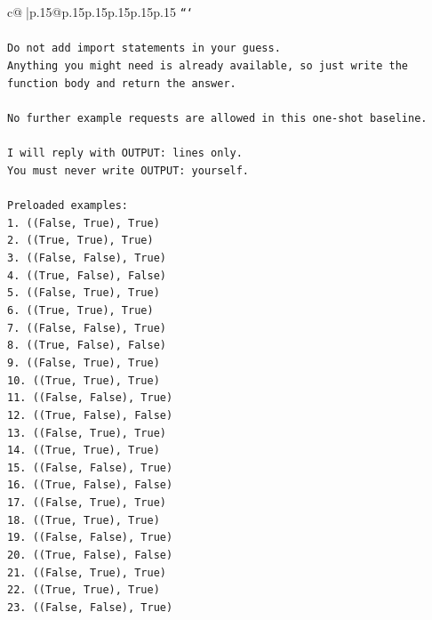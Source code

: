 \documentclass{article}
\begin{document}
{\begin{supertabular}{c@{$\;$}|p{.15\linewidth}@{}p{.15\linewidth}p{.15\linewidth}p{.15\linewidth}p{.15\linewidth}p{.15\linewidth}}
{{{\texttt{```} \\
\\ 
\texttt{Do not add import statements in your guess.} \\
\texttt{Anything you might need is already available, so just write the function body and return the answer.} \\
\\ 
\texttt{No further example requests are allowed in this one{-}shot baseline.} \\
\\ 
\texttt{I will reply with OUTPUT: lines only.} \\
\texttt{You must never write OUTPUT: yourself.} \\
\\ 
\texttt{Preloaded examples:} \\
\texttt{1. ((False, True), True)} \\
\texttt{2. ((True, True), True)} \\
\texttt{3. ((False, False), True)} \\
\texttt{4. ((True, False), False)} \\
\texttt{5. ((False, True), True)} \\
\texttt{6. ((True, True), True)} \\
\texttt{7. ((False, False), True)} \\
\texttt{8. ((True, False), False)} \\
\texttt{9. ((False, True), True)} \\
\texttt{10. ((True, True), True)} \\
\texttt{11. ((False, False), True)} \\
\texttt{12. ((True, False), False)} \\
\texttt{13. ((False, True), True)} \\
\texttt{14. ((True, True), True)} \\
\texttt{15. ((False, False), True)} \\
\texttt{16. ((True, False), False)} \\
\texttt{17. ((False, True), True)} \\
\texttt{18. ((True, True), True)} \\
\texttt{19. ((False, False), True)} \\
\texttt{20. ((True, False), False)} \\
\texttt{21. ((False, True), True)} \\
\texttt{22. ((True, True), True)} \\
\texttt{23. ((False, False), True)} \\
}}}
\end{supertabular}}
\end{document}

